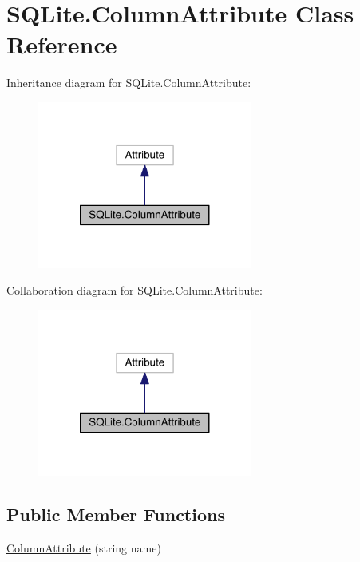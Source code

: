 \hypertarget{class_s_q_lite_1_1_column_attribute}{\section{S\+Q\+Lite.\+Column\+Attribute Class Reference}
\label{class_s_q_lite_1_1_column_attribute}
}


Inheritance diagram for S\+Q\+Lite.\+Column\+Attribute\+:
\nopagebreak
\begin{figure}[H]
\begin{center}
\leavevmode
\includegraphics[width=200pt]{class_s_q_lite_1_1_column_attribute__inherit__graph}
\end{center}
\end{figure}


Collaboration diagram for S\+Q\+Lite.\+Column\+Attribute\+:
\nopagebreak
\begin{figure}[H]
\begin{center}
\leavevmode
\includegraphics[width=200pt]{class_s_q_lite_1_1_column_attribute__coll__graph}
\end{center}
\end{figure}
\subsection*{Public Member Functions}
\begin{DoxyCompactItemize}
\item 
\hyperlink{class_s_q_lite_1_1_column_attribute_aa7ecb3d322d1fde710f51558b314ad6f}{Column\+Attribute} (string name)
\end{DoxyCompactItemize}
